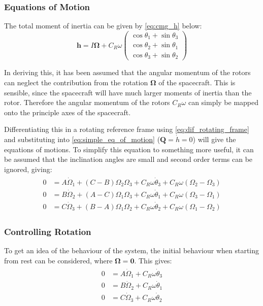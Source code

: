 \documentclass[12]{article}
\begin{document}
\begin{multicols*}{2}
\subsubsection{Equations of Motion}

The total moment of inertia can be given by \cref{eq:cmg_h} below:
\begin{equation} \label{eq:cmg_h}
\bm{h} = I\bm{\Omega} +
C_R\omega\begin{pmatrix}
\cos\theta_1 + \sin\theta_3 \\
\cos\theta_2 + \sin\theta_1 \\
\cos\theta_3 + \sin\theta_2
\end{pmatrix}
\end{equation}

In deriving this, it has been assumed that the angular momentum of the rotors can neglect the contribution from the rotation $\bm{\Omega}$ of the spacecraft. This is sensible, since the spacecraft will have much larger moments of inertia than the rotor. Therefore the angular momentum of the rotors $C_R\omega$ can simply be mapped onto the principle axes of the spacecraft.

Differentiating this in a rotating reference frame using \cref{eq:dif_rotating_frame} and substituting into \cref{eq:simple_eq_of_motion} ($\bm{Q} = \dot{h} = 0$) will give the equations of motions. To simplify this equation to something more useful, it can be assumed that the inclination angles are small and second order terms can be ignored, giving:
\begin{align} \label{eq:cmg_eq_of_motion}
\begin{split}
0 &= A\dot{\Omega}_1 + (C-B)\Omega_2\Omega_3 + C_R\omega\dot{\theta}_3 + C_R\omega(\Omega_2 - \Omega_3) \\
0 &= B\dot{\Omega}_2 + (A-C)\Omega_1\Omega_3 + C_R\omega\dot{\theta}_1 + C_R\omega(\Omega_3 - \Omega_1) \\
0 &= C\dot{\Omega}_3 + (B-A)\Omega_1\Omega_2 + C_R\omega\dot{\theta}_2 + C_R\omega(\Omega_1 - \Omega_2)
\end{split}
\end{align}

\subsubsection{Controlling Rotation}

To get an idea of the behaviour of the system, the initial behaviour when starting from rest can be considered, where $\bm{\Omega} = \bm{0}$. This gives:
\begin{align} \label{eq:cmg_initial}
\begin{split}
0 &= A\dot{\Omega}_1 + C_R\omega\dot{\theta}_3 \\
0 &= B\dot{\Omega}_2 + C_R\omega\dot{\theta}_1 \\
0 &= C\dot{\Omega}_3 + C_R\omega\dot{\theta}_2
\end{split}
\end{align}


\end{multicols*}
\end{document}
